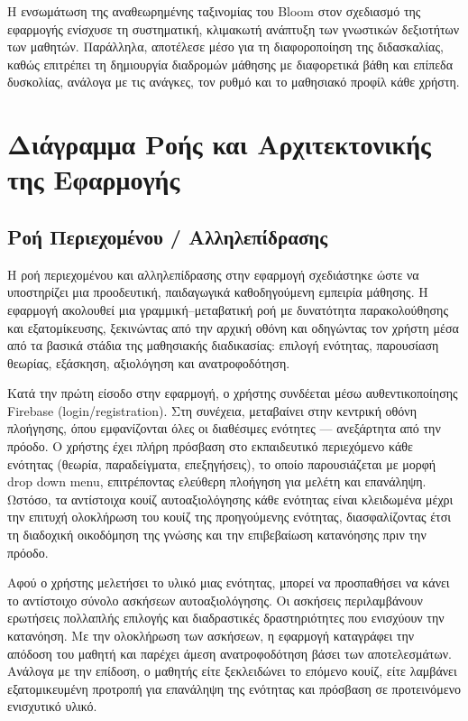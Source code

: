 \documentclass[11pt]{report}
\begin{document}
Η ενσωμάτωση της αναθεωρημένης ταξινομίας του Bloom στον σχεδιασμό της εφαρμογής ενίσχυσε τη συστηματική, κλιμακωτή ανάπτυξη των γνωστικών δεξιοτήτων των μαθητών. Παράλληλα, αποτέλεσε μέσο για τη διαφοροποίηση της διδασκαλίας, καθώς επιτρέπει τη δημιουργία διαδρομών μάθησης με διαφορετικά βάθη και επίπεδα δυσκολίας, ανάλογα με τις ανάγκες, τον ρυθμό και το μαθησιακό προφίλ κάθε χρήστη. 


\chapter{Διάγραμμα Ροής και Αρχιτεκτονικής της Εφαρμογής}
\section{Ροή Περιεχομένου / Αλληλεπίδρασης}

Η ροή περιεχομένου και αλληλεπίδρασης στην εφαρμογή σχεδιάστηκε ώστε να υποστηρίζει μια προοδευτική, παιδαγωγικά καθοδηγούμενη εμπειρία μάθησης. Η εφαρμογή ακολουθεί μια γραμμική–μεταβατική ροή με δυνατότητα παρακολούθησης και εξατομίκευσης, ξεκινώντας από την αρχική οθόνη και οδηγώντας τον χρήστη μέσα από τα βασικά στάδια της μαθησιακής διαδικασίας: επιλογή ενότητας, παρουσίαση θεωρίας, εξάσκηση, αξιολόγηση και ανατροφοδότηση. 

Κατά την πρώτη είσοδο στην εφαρμογή, ο χρήστης συνδέεται μέσω αυθεντικοποίησης Firebase (login/registration). Στη συνέχεια, μεταβαίνει στην κεντρική οθόνη πλοήγησης, όπου εμφανίζονται όλες οι διαθέσιμες ενότητες — ανεξάρτητα από την πρόοδο. Ο χρήστης έχει πλήρη πρόσβαση στο εκπαιδευτικό περιεχόμενο κάθε ενότητας (θεωρία, παραδείγματα, επεξηγήσεις), το οποίο παρουσιάζεται με μορφή drop down menu, επιτρέποντας ελεύθερη πλοήγηση για μελέτη και επανάληψη. Ωστόσο, τα αντίστοιχα κουίζ αυτοαξιολόγησης κάθε ενότητας είναι κλειδωμένα μέχρι την επιτυχή ολοκλήρωση του κουίζ της προηγούμενης ενότητας, διασφαλίζοντας έτσι τη διαδοχική οικοδόμηση της γνώσης και την επιβεβαίωση κατανόησης πριν την πρόοδο. 

Αφού ο χρήστης μελετήσει το υλικό μιας ενότητας, μπορεί να προσπαθήσει να κάνει το αντίστοιχο σύνολο ασκήσεων αυτοαξιολόγησης. Οι ασκήσεις περιλαμβάνουν ερωτήσεις πολλαπλής επιλογής και διαδραστικές δραστηριότητες που ενισχύουν την κατανόηση. Με την ολοκλήρωση των ασκήσεων, η εφαρμογή καταγράφει την απόδοση του μαθητή και παρέχει άμεση ανατροφοδότηση βάσει των αποτελεσμάτων. Ανάλογα με την επίδοση, ο μαθητής είτε ξεκλειδώνει το επόμενο κουίζ, είτε λαμβάνει εξατομικευμένη προτροπή για επανάληψη της ενότητας και πρόσβαση σε προτεινόμενο ενισχυτικό υλικό. 
\end{document}
